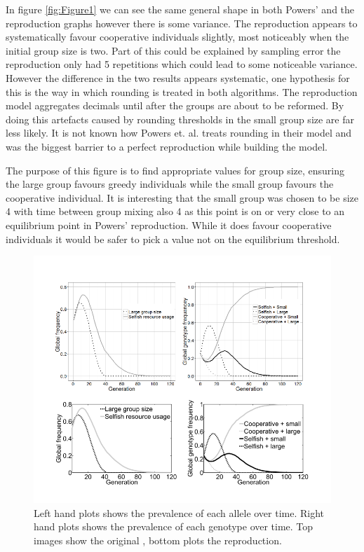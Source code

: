 \documentclass[a4paper,10pt, twocolumn]{article}
\begin{document}
In figure \ref{fig:Figure1} we can see the same general shape in both Powers' and the reproduction graphs however there is some variance. The reproduction appears to systematically favour cooperative individuals slightly, most noticeably when the initial group size is two. Part of this could be explained by sampling error the reproduction only had 5 repetitions which could lead to some noticeable variance. However the difference in the two results appears systematic, one hypothesis for this is the way in which rounding is treated in both algorithms. The reproduction model aggregates decimals until after the groups are about to be reformed. By doing this artefacts caused by rounding thresholds in the small group size are far less likely. It is not known how Powers et. al. treats rounding in their model and was the biggest barrier to a perfect reproduction while building the model. 

The purpose of this figure is to find appropriate values for group size, ensuring the large group favours greedy individuals while the small group favours the cooperative individual. It is interesting that the small group was chosen to be size 4 with time between group mixing also 4 as this point is on or very close to an equilibrium point in Powers' reproduction. While it does favour cooperative individuals it would be safer to pick a value not on the equilibrium threshold.   

\begin{figure}[ht]
	\includegraphics[width=0.9\linewidth]{Figure2.png}
	\centering
	\caption{Left hand plots shows the prevalence of each allele over time. Right hand plots shows the prevalence of each genotype over time. Top images show the original \cite{Paper}, bottom plots the reproduction.}
		\label{fig:Figure2}
\end{figure}
\end{document}

